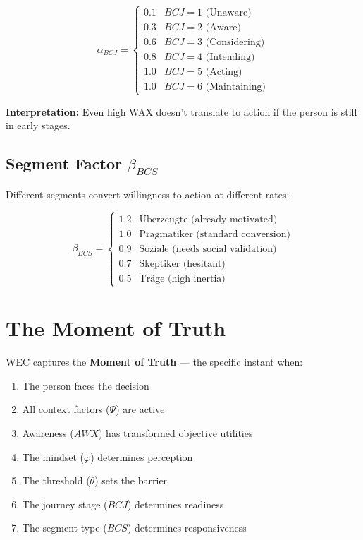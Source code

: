 \begin{equation}
\alpha_{BCJ} = \begin{cases}
0.1 & BCJ = 1 \text{ (Unaware)} \\
0.3 & BCJ = 2 \text{ (Aware)} \\
0.6 & BCJ = 3 \text{ (Considering)} \\
0.8 & BCJ = 4 \text{ (Intending)} \\
1.0 & BCJ = 5 \text{ (Acting)} \\
1.0 & BCJ = 6 \text{ (Maintaining)}
\end{cases}
\end{equation}

\textbf{Interpretation:} Even high WAX doesn't translate to action if the 
person is still in early stages.

\subsection{Segment Factor $\beta_{BCS}$}

Different segments convert willingness to action at different rates:

\begin{equation}
\beta_{BCS} = \begin{cases}
1.2 & \text{Überzeugte (already motivated)} \\
1.0 & \text{Pragmatiker (standard conversion)} \\
0.9 & \text{Soziale (needs social validation)} \\
0.7 & \text{Skeptiker (hesitant)} \\
0.5 & \text{Träge (high inertia)}
\end{cases}
\end{equation}

\section{The Moment of Truth}

WEC captures the \textbf{Moment of Truth} — the specific instant when:
\begin{enumerate}
    \item The person faces the decision
    \item All context factors ($\Psi$) are active
    \item Awareness ($AWX$) has transformed objective utilities
    \item The mindset ($\varphi$) determines perception
    \item The threshold ($\theta$) sets the barrier
    \item The journey stage ($BCJ$) determines readiness
    \item The segment type ($BCS$) determines responsiveness
\end{enumerate}

